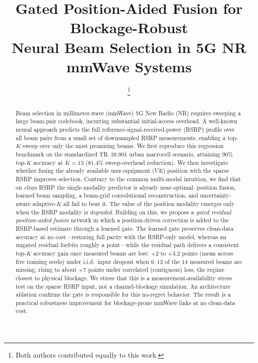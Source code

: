 \documentclass[conference]{IEEEtran}
\begin{document}
\title{Gated Position-Aided Fusion for Blockage-Robust\\ Neural Beam Selection in 5G NR mmWave Systems}

\author{
\thanks{Both authors contributed equally to this work.}}

\maketitle

\begin{abstract}
Beam selection in millimeter-wave (mmWave) 5G New Radio (NR) requires sweeping a
large beam-pair codebook, incurring substantial initial-access overhead. A
well-known neural approach predicts the full reference-signal-received-power
(RSRP) profile over all beam pairs from a small set of downsampled RSRP
measurements, enabling a top-$K$ sweep over only the most promising beams. We
first reproduce this regression benchmark on the standardized TR~38.901 urban
macrocell scenario, attaining $90\%$ top-$K$ accuracy at $K=13$ ($81.4\%$
sweep-overhead reduction). We then investigate whether fusing the already
available user-equipment (UE) position with the sparse RSRP improves selection.
Contrary to the common multi-modal intuition, we find that on \emph{clean} RSRP
the single-modality predictor is already near-optimal: position fusion, learned
beam sampling, a beam-grid convolutional reconstruction, and uncertainty-aware
adaptive-$K$ all fail to beat it. The value of the position modality emerges only
when the RSRP modality is \emph{degraded}. Building on this, we propose a
\emph{gated residual position-aided fusion} network in which a position-driven
correction is added to the RSRP-based estimate through a learned gate. The learned
gate preserves clean-data accuracy at no cost---restoring full parity with the
RSRP-only model, whereas an ungated residual forfeits roughly a point---while the
residual path delivers a consistent top-$K$ accuracy gain once measured beams are
lost: $+2$ to $+3.2$ points (mean across five training seeds) under i.i.d.\ input
dropout when $6$--$12$ of the $14$ measured beams are missing, rising to about
$+7$ points under correlated (contiguous) loss, the regime closest to physical
blockage. We stress that this
is a measurement-availability stress test on the sparse RSRP input, not a
channel-blockage simulation. An architecture ablation confirms the gate is
responsible for this no-regret behavior. The result is a practical robustness
improvement for blockage-prone mmWave links at no clean-data cost.
\end{abstract}
\end{document}
